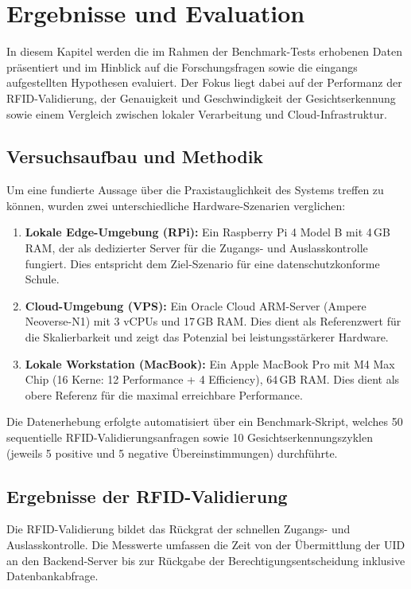 \section{Ergebnisse und Evaluation}
\label{sec:ergebnisse}

In diesem Kapitel werden die im Rahmen der Benchmark-Tests erhobenen Daten präsentiert und im Hinblick auf die Forschungsfragen sowie die eingangs aufgestellten Hypothesen evaluiert. Der Fokus liegt dabei auf der Performanz der RFID-Validierung, der Genauigkeit und Geschwindigkeit der Gesichtserkennung sowie einem Vergleich zwischen lokaler Verarbeitung und Cloud-Infrastruktur.

\subsection{Versuchsaufbau und Methodik}
\label{subsec:versuchsaufbau}

Um eine fundierte Aussage über die Praxistauglichkeit des Systems treffen zu können, wurden zwei unterschiedliche Hardware-Szenarien verglichen:

\begin{enumerate}
    \item \textbf{Lokale Edge-Umgebung (RPi):} Ein Raspberry Pi 4 Model B mit 4\,GB RAM, der als dedizierter Server für die Zugangs- und Auslasskontrolle fungiert. Dies entspricht dem Ziel-Szenario für eine datenschutzkonforme Schule.
    \item \textbf{Cloud-Umgebung (VPS):} Ein Oracle Cloud ARM-Server (Ampere Neoverse-N1) mit 3 vCPUs und 17\,GB RAM. Dies dient als Referenzwert für die Skalierbarkeit und zeigt das Potenzial bei leistungsstärkerer Hardware.
    \item \textbf{Lokale Workstation (MacBook):} Ein Apple MacBook Pro mit M4 Max Chip (16 Kerne: 12 Performance + 4 Efficiency), 64\,GB RAM. Dies dient als obere Referenz für die maximal erreichbare Performance.
\end{enumerate}
Die Datenerhebung erfolgte automatisiert über ein Benchmark-Skript, welches 50 sequentielle RFID-Validierungsanfragen sowie 10 Gesichtserkennungszyklen (jeweils 5 positive und 5 negative Übereinstimmungen) durchführte.

\subsection{Ergebnisse der RFID-Validierung}
\label{subsec:ergebnisse_rfid}

Die RFID-Validierung bildet das Rückgrat der schnellen Zugangs- und Auslasskontrolle. Die Messwerte umfassen die Zeit von der Übermittlung der UID an den Backend-Server bis zur Rückgabe der Berechtigungsentscheidung inklusive Datenbankabfrage.

